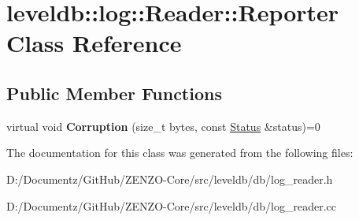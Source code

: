 \hypertarget{classleveldb_1_1log_1_1_reader_1_1_reporter}{}\section{leveldb\+::log\+::Reader\+::Reporter Class Reference}
\label{classleveldb_1_1log_1_1_reader_1_1_reporter}
\subsection*{Public Member Functions}
\begin{DoxyCompactItemize}
\item 
\mbox{\label{classleveldb_1_1log_1_1_reader_1_1_reporter_a2d28d30f9559d5fc9f94af41d239932e}} 
virtual void {\bfseries Corruption} (size\+\_\+t bytes, const \mbox{\hyperlink{classleveldb_1_1_status}{Status}} \&status)=0
\end{DoxyCompactItemize}


The documentation for this class was generated from the following files\+:\begin{DoxyCompactItemize}
\item 
D\+:/\+Documentz/\+Git\+Hub/\+Z\+E\+N\+Z\+O-\/\+Core/src/leveldb/db/log\+\_\+reader.\+h\item 
D\+:/\+Documentz/\+Git\+Hub/\+Z\+E\+N\+Z\+O-\/\+Core/src/leveldb/db/log\+\_\+reader.\+cc\end{DoxyCompactItemize}
